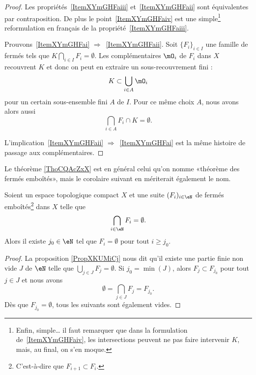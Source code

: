 \begin{proof}
	Les propriétés~\ref{ItemXYmGHFaiii} et~\ref{ItemXYmGHFaii} sont équivalentes par contraposition. De plus le point~\ref{ItemXYmGHFaiv} est une simple\footnote{Enfin, simple\dots{} il faut remarquer que dans la formulation de~\ref{ItemXYmGHFaiv}, les intersections peuvent ne pas faire intervenir \( K \), mais, au final, on s'en moque.} reformulation en français de la propriété~\ref{ItemXYmGHFaiii}.

	Prouvons~\ref{ItemXYmGHFai} \( \Rightarrow\)~\ref{ItemXYmGHFaii}. Soit \( \{ F_i \}_{i\in I}\) une famille de fermés tels que \( K\bigcap_{i\in I}F_i=\emptyset\). Les complémentaires \( \mO_i\) de \( F_i\) dans \( X\) recouvrent \( K\) et donc on peut en extraire un sous-recouvrement fini :
	\begin{equation}
		K\subset\bigcup_{i\in A}\mO_i
	\end{equation}
	pour un certain sous-ensemble fini \( A\) de \( I\). Pour ce même choix \( A\), nous avons alors aussi
	\begin{equation}
		\bigcap_{i\in A}F_i \cap K =\emptyset.
	\end{equation}

	L'implication~\ref{ItemXYmGHFaii} \( \Rightarrow\)~\ref{ItemXYmGHFai} est la même histoire de passage aux complémentaires.
\end{proof}

Le théorème \ref{ThoCQAcZxX} est en général celui qu'on nomme «théorème des fermés emboîtés», mais le corolaire suivant en mériterait également le nom.
\begin{corollary}       \label{CORooQABLooMPSUBf}
	Soient un espace topologique compact \( X\) et une suite \( (F_i)_{i\in \eN}\) de fermés emboîtés\footnote{C'est-à-dire que \( F_{i+1}\subset F_i\).} dans \( X\) telle que
	\begin{equation}
		\bigcap_{i\in \eN}F_i=\emptyset.
	\end{equation}
	Alors il existe \( j_0\in \eN\) tel que \( F_i=\emptyset\) pour tout \( i\geq j_0\).
\end{corollary}

\begin{proof}
	La proposition \ref{PropXKUMiCj} nous dit qu'il existe une partie finie non vide \( J\) de \( \eN\) telle que \( \bigcup_{j\in J}F_j=\emptyset\). Si \( j_0=\min(J)\), alors \( F_j\subset F_{j_0}\) pour tout \( j\in J\) et nous avons
	\begin{equation}
		\emptyset=\bigcap_{j\in J}F_j=F_{j_0}.
	\end{equation}
	Dès que \( F_{j_0}=\emptyset\), tous les suivants sont également vides.
\end{proof}




